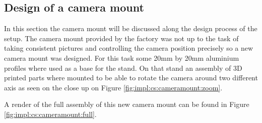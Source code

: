 	\subsection{Design of a camera mount}
	\label{sec:impl:camerasetup:cameramount} 
	In this section the camera mount will be discussed along the design process of the setup.
		The camera mount provided by the factory was not up to the task of taking consistent pictures and controlling the camera position precisely so a new camera mount was designed. For this task some 20mm by 20mm aluminium profiles where used as a base for the stand. On that stand an assembly of 3D printed parts where mounted to be able to rotate the camera around two different axis as seen on the close up on Figure \ref{fig:impl:cs:cameramount:zoom}. 
		
		A render of the full assembly of this new camera mount can be found in Figure \ref{fig:impl:cs:cameramount:full}.
		
